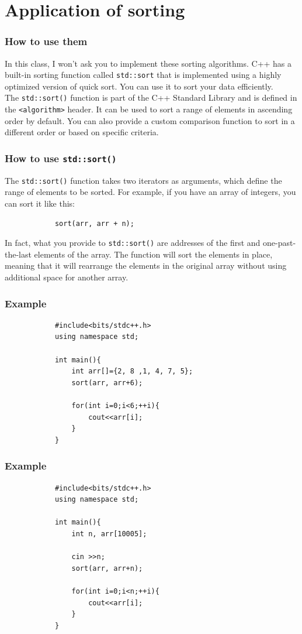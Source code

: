 \documentclass[xcolor=dvipsnames]{beamer}
\begin{document}
    \section{Application of sorting}
    \begin{frame}
        \frametitle{How to use them}
        In this class, I won't ask you to implement these sorting algorithms. C++ has a built-in sorting function called \texttt{std::sort} that is implemented using a highly optimized version of quick sort. You can use it to sort your data efficiently.\\
        The \texttt{std::sort()} function is part of the C++ Standard Library and is defined in the \texttt{<algorithm>} header. It can be used to sort a range of elements in ascending order by default. You can also provide a custom comparison function to sort in a different order or based on specific criteria.\\
    \end{frame}
    \begin{frame}[fragile]
        \frametitle{How to use \texttt{std::sort()}}
        The \texttt{std::sort()} function takes two iterators as arguments, which define the range of elements to be sorted. For example, if you have an array of integers, you can sort it like this:
        \begin{verbatim}
            sort(arr, arr + n);
        \end{verbatim}
        In fact, what you provide to \texttt{std::sort()} are addresses of the first and one-past-the-last elements of the array. The function will sort the elements in place, meaning that it will rearrange the elements in the original array without using additional space for another array.
    \end{frame}
    \begin{frame}[fragile]
        \frametitle{Example}
        \begin{verbatim}
            #include<bits/stdc++.h>
            using namespace std;

            int main(){
                int arr[]={2, 8 ,1, 4, 7, 5};
                sort(arr, arr+6);

                for(int i=0;i<6;++i){
                    cout<<arr[i];
                }
            }
        \end{verbatim}
    \end{frame}
    \begin{frame}[fragile]
        \frametitle{Example}
        \begin{verbatim}
            #include<bits/stdc++.h>
            using namespace std;

            int main(){
                int n, arr[10005];

                cin >>n;
                sort(arr, arr+n);

                for(int i=0;i<n;++i){
                    cout<<arr[i];
                }
            }
        \end{verbatim}
    \end{frame}
\end{document}
